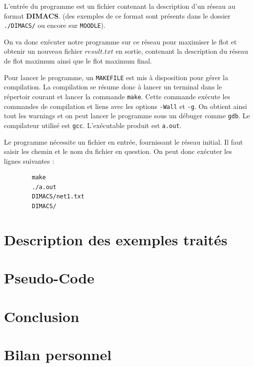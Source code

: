 \documentclass[11pt, a4paper]{report}
\begin{document}
	L'entrée du programme est un fichier contenant la description d'un réseau au format \textbf{DIMACS}. (des exemples de ce format sont présents dans le dossier \verb|./DIMACS/| ou encore sur \verb*|MOODLE|).
	
	On va donc exécuter notre programme sur ce réseau pour maximiser le flot et obtenir un nouveau fichier $result.txt$ en sortie, contenant la description du réseau de flot maximum ainsi que le flot maximum final.
	
	Pour lancer le programme, un \verb|MAKEFILE| est mis à disposition pour gérer la compilation. La compilation se résume donc à lancer un terminal dans le répertoir courant et lancer la commande \verb|make|. Cette commande exécute les commandes de compilation et liens avec les options \verb|-Wall| et \verb|-g|. On obtient ainsi tout les warnings et on peut lancer le programme sous un débuger comme \verb|gdb|. Le compilateur utilisé est \verb|gcc|. L'exécutable produit est \verb|a.out|.
	
	Le programme nécessite un fichier en entrée, fournissant le réseau initial. Il faut saisir les chemin et le nom du fichier en question. On peut donc exécuter les lignes suivantes :
	\lstset{language=bash}
	\begin{lstlisting}
		make
		./a.out
		DIMACS/net1.txt
		DIMACS/
	\end{lstlisting}
	
	
	
	\chapter{Description des exemples traités}
	
	
	\chapter{Pseudo-Code}
	
	
	\chapter*{Conclusion}
	
	
	\chapter*{Bilan personnel}
	
	
	
	
	
	
	
	
	
\end{document}
